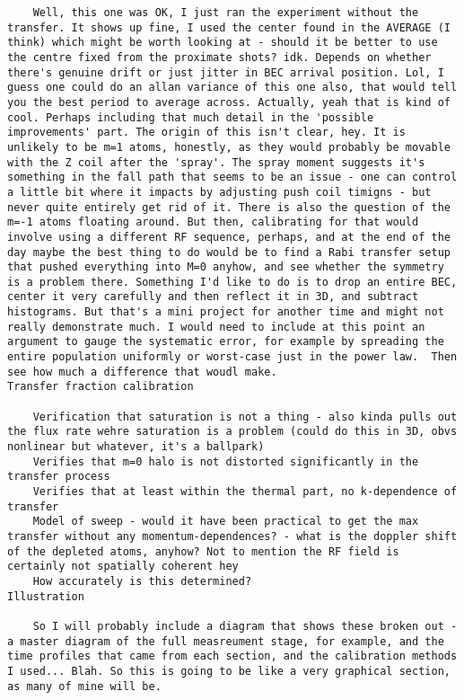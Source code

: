 \begin{verbatim}
    Well, this one was OK, I just ran the experiment without the transfer. It shows up fine, I used the center found in the AVERAGE (I think) which might be worth looking at - should it be better to use the centre fixed from the proximate shots? idk. Depends on whether there's genuine drift or just jitter in BEC arrival position. Lol, I guess one could do an allan variance of this one also, that would tell you the best period to average across. Actually, yeah that is kind of cool. Perhaps including that much detail in the 'possible improvements' part. The origin of this isn't clear, hey. It is unlikely to be m=1 atoms, honestly, as they would probably be movable with the Z coil after the 'spray'. The spray moment suggests it's something in the fall path that seems to be an issue - one can control a little bit where it impacts by adjusting push coil timigns - but never quite entirely get rid of it. There is also the question of the m=-1 atoms floating around. But then, calibrating for that would involve using a different RF sequence, perhaps, and at the end of the day maybe the best thing to do would be to find a Rabi transfer setup that pushed everything into M=0 anyhow, and see whether the symmetry is a problem there. Something I'd like to do is to drop an entire BEC, center it very carefully and then reflect it in 3D, and subtract histograms. But that's a mini project for another time and might not really demonstrate much. I would need to include at this point an argument to gauge the systematic error, for example by spreading the entire population uniformly or worst-case just in the power law.  Then see how much a difference that woudl make.
Transfer fraction calibration

    Verification that saturation is not a thing - also kinda pulls out the flux rate wehre saturation is a problem (could do this in 3D, obvs nonlinear but whatever, it's a ballpark)
    Verifies that m=0 halo is not distorted significantly in the transfer process
    Verifies that at least within the thermal part, no k-dependence of transfer
    Model of sweep - would it have been practical to get the max transfer without any momentum-dependences? - what is the doppler shift of the depleted atoms, anyhow? Not to mention the RF field is certainly not spatially coherent hey
    How accurately is this determined? 
Illustration

    So I will probably include a diagram that shows these broken out - a master diagram of the full measreument stage, for example, and the time profiles that came from each section, and the calibration methods I used... Blah. So this is going to be like a very graphical section, as many of mine will be. 
\end{verbatim}

